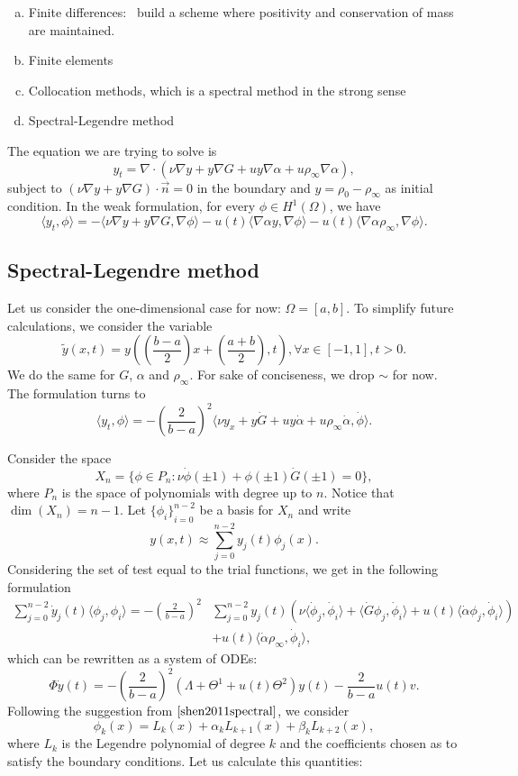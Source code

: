 \documentclass[12pt]{article}
\newcommand{\n}{\vec{n}}
\newcommand{\steady}{\rho_{\infty}}
\newcommand{\inner}[2]{\langle{} #1, #2 \rangle{}}
\theoremstyle{definition}
\begin{document}
\begin{enumerate}[(a)]
    \item Finite differences:~\cite{chang1970practical} build a scheme where positivity and conservation of mass are maintained.
    \item Finite elements
    \item Collocation methods, which is a spectral method in the strong sense
    \item Spectral-Legendre method
\end{enumerate}

The equation we are trying to solve is 
\[
y_t = \nabla \cdot (\nu \nabla y + y \nabla G + u y \nabla \alpha + u \steady \nabla \alpha),
\]
subject to $(\nu \nabla y + y \nabla G) \cdot \n = 0$ in the boundary and $y = \rho_0 - \steady$ as initial condition.
In the weak formulation, for every $\phi \in H^1(\Omega)$, we have
\[
\inner{y_t}{\phi} = -\inner{\nu \nabla y + y \nabla G}{\nabla \phi} - u(t)\inner{\nabla \alpha y}{\nabla \phi} - u(t)\inner{ \nabla \alpha \steady}{\nabla \phi}.
\]

\subsection{Spectral-Legendre method}

Let us consider the one-dimensional case for now: $\Omega = [a,b]$.
To simplify future calculations, we consider the variable
\[
\tilde{y}(x,t) = y\left(\left(\frac{b-a}{2}\right)x + \left(\frac{a+b}{2}\right), t\right), \forall x \in [-1,1], t > 0.    
\]
We do the same for $G$, $\alpha$ and $\steady$. 
For sake of conciseness, we drop $\sim$ for now.
The formulation turns to 
\[
\inner{y_t}{\phi} = - {\left(\frac{2}{b-a}\right)}^2\inner{\nu y_x + y \dot{G} + u y \dot{\alpha} + u\steady \dot{\alpha}}{\dot{\phi}}.
\]

Consider the space 
\[
X_n = \{\phi \in P_n : \nu \dot{\phi}(\pm 1) + \phi(\pm 1) \dot{G}(\pm 1) = 0\},
\]
where $P_n$ is the space of polynomials with degree up to $n$.
Notice that $\dim(X_n) = n-1$.
Let ${\{\phi_i\}}_{i=0}^{n-2}$ be a basis for $X_n$ and write 
\[
y(x,t) \approx \sum_{j=0}^{n-2} y_j(t) \phi_j(x). 
\]
Considering the set of test equal to the trial functions, we get in the following formulation
\[
\begin{split}
    \sum_{j=0}^{n-2} \dot{y}_j(t) \inner{\phi_j}{\phi_i} = -{\left(\frac{2}{b-a}\right)}^2 &\sum_{j=0}^{n-2} y_j(t) \left(\nu \inner{\dot{\phi}_j}{\dot{\phi}_i} + \inner{\dot{G} \phi_j}{\dot{\phi}_i} + u(t)\inner{\dot{\alpha}\phi_j}{\dot{\phi}_i} \right) \\ 
    &+ u(t) \inner{\dot{\alpha} \steady}{\dot{\phi}_i},
\end{split}
\]
which can be rewritten as a system of ODEs:
\[
\Phi \dot{y}(t) = -{\left(\frac{2}{b-a}\right)}^2 (\Lambda + \Theta^1 + u(t)\Theta^2)y(t) -\frac{2}{b-a}u(t)v.    
\]
Following the suggestion from $\cite[p.7]{shen2011spectral}$, we consider
\[
\phi_k(x) = L_k(x) + \alpha_k L_{k+1}(x) + \beta_k L_{k+2}(x),    
\]
where $L_k$ is the Legendre polynomial of degree $k$ and the coefficients chosen as to satisfy the boundary conditions. 
Let us calculate this quantities:
\end{document}
